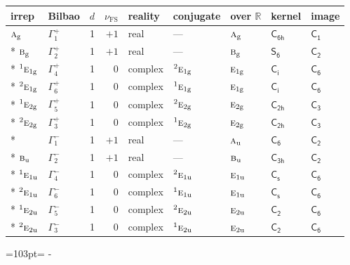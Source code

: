 \documentclass[10pt,a4paper]{article}
\newcommand{\needspace}[1]{\par\penalty-100\begingroup\dimen0=#1\relax\dimen2=\pagegoal
  \advance\dimen2-\pagetotal\ifdim\dimen0>\dimen2\relax\ifdim\dimen2>0pt\vfil\break\fi\fi
  \endgroup}
\numberwithin{equation}{section}
\newcommand{\grp}[1]{\mathsf{#1}}
\newcommand{\irr}[1]{\text{\normalfont\scshape #1}}
\newcommand{\conjpair}[1]{{}^{#1}}
\newcommand{\detbox}[1]{{\setlength{\fboxsep}{1pt}\fbox{#1}}}
\newcommand{\ptag}[1]{\mathrm{#1}}
\newcommand{\fsind}{\nu_{\mathrm{FS}}}
\begin{document}
{\small\renewcommand{\arraystretch}{1.25}\setlength{\tabcolsep}{4pt}\begin{longtable}{@{}llrrlllll@{}}\toprule
irrep & Bilbao & $d$ & $\fsind$ & reality & conjugate & over $\mathbb{R}$ & kernel & image\\\midrule\endhead
\bottomrule\endfoot\endlastfoot
$\irr{a}_{\ptag{g}}$ & $\Gamma_{1}^{+}$ & 1 & $+1$ & real & --- & $\irr{a}_{\ptag{g}}$ & \href{C6h.pdf}{$\grp{C_{6h}}$} & \href{C1.pdf}{$\grp{C_{1}}$}\\*
$\irr{b}_{\ptag{g}}$ & $\Gamma_{2}^{+}$ & 1 & $+1$ & real & --- & $\irr{b}_{\ptag{g}}$ & \href{S6.pdf}{$\grp{S_{6}}$} & \href{C2.pdf}{$\grp{C_{2}}$}\\*
$\conjpair{1}\irr{e}_{1\ptag{g}}$ & $\Gamma_{4}^{+}$ & 1 & $0$ & complex & $\conjpair{2}\irr{e}_{1\ptag{g}}$ & $\irr{e}_{1\ptag{g}}$ & \href{S2.pdf}{$\grp{C_{i}}$} & \href{C6.pdf}{$\grp{C_{6}}$}\\*
$\conjpair{2}\irr{e}_{1\ptag{g}}$ & $\Gamma_{6}^{+}$ & 1 & $0$ & complex & $\conjpair{1}\irr{e}_{1\ptag{g}}$ & $\irr{e}_{1\ptag{g}}$ & \href{S2.pdf}{$\grp{C_{i}}$} & \href{C6.pdf}{$\grp{C_{6}}$}\\*
$\conjpair{1}\irr{e}_{2\ptag{g}}$ & $\Gamma_{5}^{+}$ & 1 & $0$ & complex & $\conjpair{2}\irr{e}_{2\ptag{g}}$ & $\irr{e}_{2\ptag{g}}$ & \href{C2h.pdf}{$\grp{C_{2h}}$} & \href{C3.pdf}{$\grp{C_{3}}$}\\*
$\conjpair{2}\irr{e}_{2\ptag{g}}$ & $\Gamma_{3}^{+}$ & 1 & $0$ & complex & $\conjpair{1}\irr{e}_{2\ptag{g}}$ & $\irr{e}_{2\ptag{g}}$ & \href{C2h.pdf}{$\grp{C_{2h}}$} & \href{C3.pdf}{$\grp{C_{3}}$}\\*
\detbox{$\irr{a}_{\ptag{u}}$} & $\Gamma_{1}^{-}$ & 1 & $+1$ & real & --- & $\irr{a}_{\ptag{u}}$ & \href{C6.pdf}{$\grp{C_{6}}$} & \href{C2.pdf}{$\grp{C_{2}}$}\\*
$\irr{b}_{\ptag{u}}$ & $\Gamma_{2}^{-}$ & 1 & $+1$ & real & --- & $\irr{b}_{\ptag{u}}$ & \href{C3h.pdf}{$\grp{C_{3h}}$} & \href{C2.pdf}{$\grp{C_{2}}$}\\*
$\conjpair{1}\irr{e}_{1\ptag{u}}$ & $\Gamma_{4}^{-}$ & 1 & $0$ & complex & $\conjpair{2}\irr{e}_{1\ptag{u}}$ & $\irr{e}_{1\ptag{u}}$ & \href{C1v.pdf}{$\grp{C_{s}}$} & \href{C6.pdf}{$\grp{C_{6}}$}\\*
$\conjpair{2}\irr{e}_{1\ptag{u}}$ & $\Gamma_{6}^{-}$ & 1 & $0$ & complex & $\conjpair{1}\irr{e}_{1\ptag{u}}$ & $\irr{e}_{1\ptag{u}}$ & \href{C1v.pdf}{$\grp{C_{s}}$} & \href{C6.pdf}{$\grp{C_{6}}$}\\*
$\conjpair{1}\irr{e}_{2\ptag{u}}$ & $\Gamma_{5}^{-}$ & 1 & $0$ & complex & $\conjpair{2}\irr{e}_{2\ptag{u}}$ & $\irr{e}_{2\ptag{u}}$ & \href{C2.pdf}{$\grp{C_{2}}$} & \href{C6.pdf}{$\grp{C_{6}}$}\\*
$\conjpair{2}\irr{e}_{2\ptag{u}}$ & $\Gamma_{3}^{-}$ & 1 & $0$ & complex & $\conjpair{1}\irr{e}_{2\ptag{u}}$ & $\irr{e}_{2\ptag{u}}$ & \href{C2.pdf}{$\grp{C_{2}}$} & \href{C6.pdf}{$\grp{C_{6}}$}\\
\bottomrule\end{longtable}}
\needspace{103pt}
\end{document}
